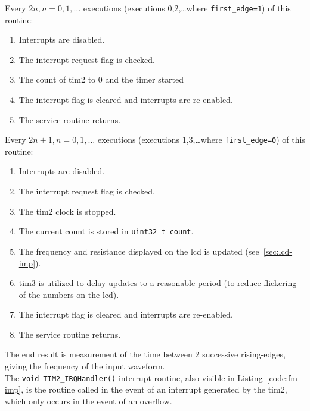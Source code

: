 
Every $2n, n=0,1,\dots$  executions (executions 0,2,\dots where
\lstinline{first_edge=1}) of this routine:

\begin{enumerate}
	\item Interrupts are disabled.
	\item The interrupt request flag is checked.
	\item The count of \gls{tim2} to 0 and the timer started
	\item The interrupt flag is cleared and interrupts are re-enabled.
	\item The service routine returns.
\end{enumerate}

Every $2n+1, n=0,1,\dots$ executions (executions 1,3,\dots where
\lstinline{first_edge=0}) of this routine:

\begin{enumerate}
	\item Interrupts are disabled.
	\item The interrupt request flag is checked.
	\item The \gls{tim2} clock is stopped.
	\item The current count is stored in \lstinline{uint32_t count}.
	\item The frequency and resistance displayed on the \gls{lcd} is
		updated (see~\ref{sec:lcd-imp}).
	\item \gls{tim3} is utilized to delay updates to a reasonable period
		(to reduce flickering of the numbers on the \gls{lcd}).
	\item The interrupt flag is cleared and interrupts are re-enabled.
	\item The service routine returns.
\end{enumerate}

The end result is measurement of the time between 2 successive
rising-edges, giving the frequency of the input waveform. \\ 

The \lstinline{void TIM2_IRQHandler()} interrupt routine, also visible in
Listing~\ref{code:fm-imp}, is the routine called in the event of an
interrupt generated by the \gls{tim2}, which only occurs in the event of
an overflow.

